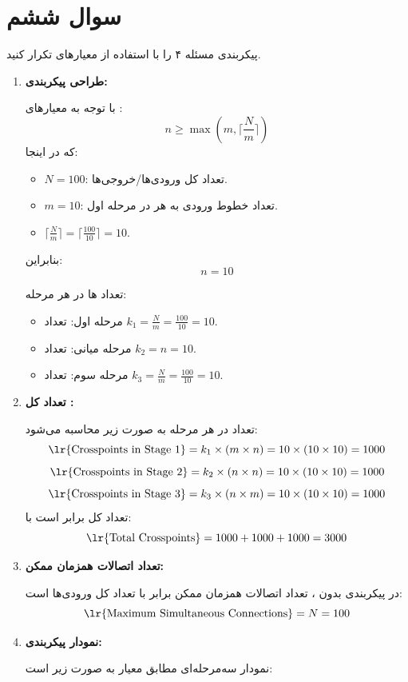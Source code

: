 \section{سوال ششم}


پیکربندی مسئله ۴ را با استفاده از معیارهای  تکرار کنید.


\begin{qsolve}
	\begin{enumerate}[label=\arabic*.]
		\item \textbf{طراحی پیکربندی:}
		
		با توجه به معیارهای :
		\[
		n \geq \max(m, \lceil \frac{N}{m} \rceil)
		\]
		که در اینجا:
		\begin{itemize}
			\item \(N = 100\): تعداد کل ورودی‌ها/خروجی‌ها.
			\item \(m = 10\): تعداد خطوط ورودی به هر  در مرحله اول.
			\item \(\lceil \frac{N}{m} \rceil = \lceil \frac{100}{10} \rceil = 10\).
		\end{itemize}
		بنابراین:
		\[
		n = 10
		\]
		
		تعداد ‌ها در هر مرحله:
		\begin{itemize}
			\item مرحله اول: تعداد \(k_1 = \frac{N}{m} = \frac{100}{10} = 10\).
			\item مرحله میانی: تعداد \(k_2 = n = 10\).
			\item مرحله سوم: تعداد \(k_3 = \frac{N}{m} = \frac{100}{10} = 10\).
		\end{itemize}
		
		\item \textbf{تعداد کل :}
		
		تعداد  در هر مرحله به صورت زیر محاسبه می‌شود:
		\[
		\text{\lr{Crosspoints in Stage 1}} = k_1 \times (m \times n) = 10 \times (10 \times 10) = 1000
		\]
		\[
		\text{\lr{Crosspoints in Stage 2}} = k_2 \times (n \times n) = 10 \times (10 \times 10) = 1000
		\]
		\[
		\text{\lr{Crosspoints in Stage 3}} = k_3 \times (n \times m) = 10 \times (10 \times 10) = 1000
		\]
		تعداد کل  برابر است با:
		\[
		\text{\lr{Total Crosspoints}} = 1000 + 1000 + 1000 = 3000
		\]
		
		\item \textbf{تعداد اتصالات همزمان ممکن:}
		
		در پیکربندی  بدون ، تعداد اتصالات همزمان ممکن برابر با تعداد کل ورودی‌ها است:
		\[
		\text{\lr{Maximum Simultaneous Connections}} = N = 100
		\]
		
		\item \textbf{نمودار پیکربندی:}
		
		نمودار سه‌مرحله‌ای مطابق معیار  به صورت زیر است:
		
	\end{enumerate}
\end{qsolve}
\newpage

